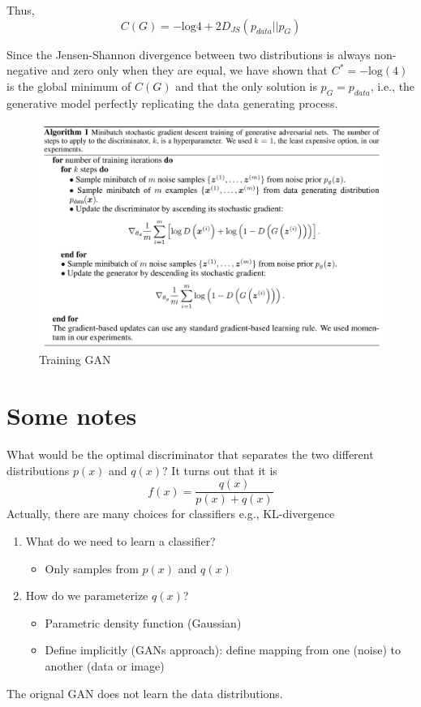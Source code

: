Thus,
$$C(G) = -\textrm{log}4 + 2D_{JS}(p_{data}||p_{G})$$

Since the Jensen-Shannon divergence between two distributions is always non-negative and zero only when they are equal, we have shown that $C^* = -\textrm{log}(4)$ is the global minimum of $C(G)$ and that the only solution is $p_G=p_{data}$, i.e., the generative model perfectly replicating the data generating process.

\begin{figure}[h]
	\centering
	\includegraphics[scale=0.3]{./images/generative/gan/gan_algorithm.png}
	\caption{Training GAN}
	\label{fig:algorithm}
\end{figure}

\section{Some notes}
What would be the optimal discriminator that separates the two different distributions $p(x)$ and $q(x)$? It turns out that it is
$$f(x) = \frac{q(x)}{p(x)+q(x)}$$
Actually, there are many choices for classifiers e.g., KL-divergence

\begin{enumerate}
	\item What do we need to learn a classifier?
	\begin{itemize}
		\item Only samples from $p(x)$ and $q(x)$
	\end{itemize}
	\item How do we parameterize $q(x)$?
	\begin{itemize}
		\item Parametric density function (Gaussian)
		\item Define implicitly (GANs approach): define mapping from one (noise) to another (data or image)
	\end{itemize}
\end{enumerate}

The orignal GAN does not learn the data distributions. 




